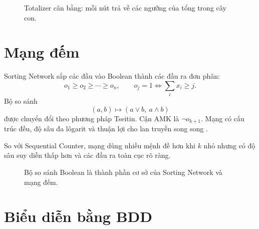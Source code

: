 \begin{figure}[tb]
\centering
{}
\caption{Totalizer cân bằng: mỗi nút trả về các ngưỡng của tổng trong cây con.}
\label{fig:totalizer-tree}
\end{figure}

\section{Mạng đếm}

Sorting Network sắp các đầu vào Boolean thành các đầu ra đơn phân:
\[
  o_1\ge o_2\ge\cdots\ge o_n,
  \qquad
  o_j=1\iff\sum_i x_i\ge j.
\]
Bộ so sánh
\[
  (a,b)\mapsto(a\lor b,\ a\land b)
\]
được chuyển đổi theo phương pháp Tseitin. Cận AMK là \(\neg o_{k+1}\). Mạng có cấu trúc đều, độ sâu
đa lôgarit và thuận lợi cho lan truyền song song
\parencite{batcher1968sorting,asin2011networks}.

So với Sequential Counter, mạng dùng nhiều mệnh đề hơn khi \(k\) nhỏ nhưng có độ
sâu suy diễn thấp hơn và các đầu ra toàn cục rõ ràng.

\begin{figure}[tb]
\centering
{}
\caption{Bộ so sánh Boolean là thành phần cơ sở của Sorting Network và mạng đếm.}
\label{fig:boolean-comparator}
\end{figure}

\section{Biểu diễn bằng BDD}

